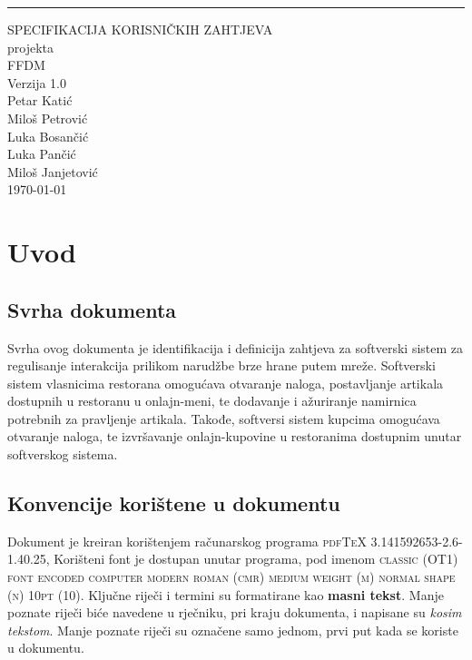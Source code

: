 \documentclass{scrreprt}
\date{}
\def\myversion{1.0}
\begin{document}
\begin{flushright}
	\rule{14.5cm}{5pt}\vskip 1cm
	\begin{bfseries}
		\Huge{SPECIFIKACIJA KORISNIČKIH ZAHTJEVA}\\
		\vspace{1.9cm}
		projekta\\
		\vspace{1.9cm}
		FFDM\\
		\vspace{1.9cm}
		\LARGE{Verzija \myversion}\\
		\vspace{1.9cm}
		Petar Katić\\
		Miloš Petrović\\
		Luka Bosančić\\
		Luka Pančić\\
		Miloš Janjetović\\
		\vspace{1.9cm}
		\today\\
	\end{bfseries}
\end{flushright}

\renewcommand{\contentsname}{Sadržaj}
\tableofcontents

\chapter{Uvod}

\section{Svrha dokumenta}
Svrha ovog dokumenta je identifikacija i definicija zahtjeva za softverski sistem za
regulisanje interakcija prilikom narudžbe brze hrane putem mreže.
Softverski sistem vlasnicima restorana omogućava otvaranje naloga, postavljanje artikala
dostupnih u restoranu u onlajn-meni, te dodavanje i ažuriranje namirnica potrebnih za
pravljenje artikala.
Takođe, softversi sistem kupcima omogućava otvaranje naloga, te izvršavanje onlajn-kupovine
u restoranima dostupnim unutar softverskog sistema.

\section{Konvencije korištene u dokumentu}
Dokument je kreiran korištenjem računarskog programa \textsc{pdfTeX 3.141592653-2.6-1.40.25},
Korišteni font je dostupan unutar programa, pod imenom \textsc{classic (OT1) font encoded
computer modern roman (cmr) medium weight (m) normal shape (n) 10pt (10)}. Ključne riječi
i termini su formatirane kao \textbf{masni tekst}. Manje poznate riječi biće navedene u
rječniku, pri kraju dokumenta, i napisane su \textit{kosim tekstom}. Manje poznate riječi
su označene samo jednom, prvi put kada se koriste u dokumentu.
\end{document}
